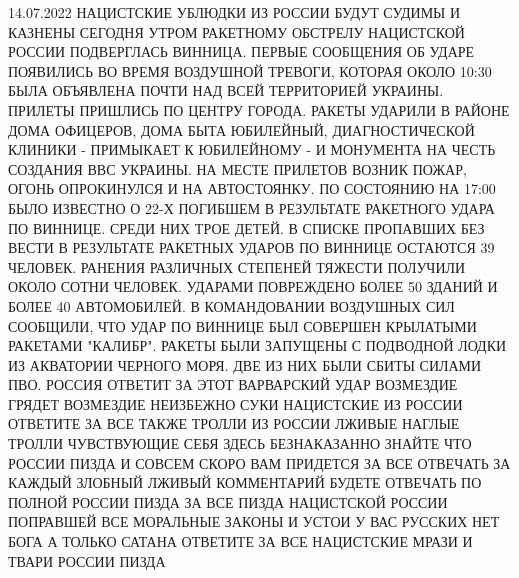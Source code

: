 14.07.2022
НАЦИСТСКИЕ УБЛЮДКИ ИЗ РОССИИ БУДУТ СУДИМЫ И КАЗНЕНЫ СЕГОДНЯ УТРОМ РАКЕТНОМУ
ОБСТРЕЛУ НАЦИСТСКОЙ РОССИИ ПОДВЕРГЛАСЬ ВИННИЦА. ПЕРВЫЕ СООБЩЕНИЯ ОБ УДАРЕ
ПОЯВИЛИСЬ ВО ВРЕМЯ ВОЗДУШНОЙ ТРЕВОГИ, КОТОРАЯ ОКОЛО 10:30 БЫЛА ОБЪЯВЛЕНА ПОЧТИ
НАД ВСЕЙ ТЕРРИТОРИЕЙ УКРАИНЫ. ПРИЛЕТЫ ПРИШЛИСЬ ПО ЦЕНТРУ ГОРОДА. РАКЕТЫ УДАРИЛИ
В РАЙОНЕ ДОМА ОФИЦЕРОВ, ДОМА БЫТА ЮБИЛЕЙНЫЙ, ДИАГНОСТИЧЕСКОЙ КЛИНИКИ
- ПРИМЫКАЕТ К ЮБИЛЕЙНОМУ - И МОНУМЕНТА НА ЧЕСТЬ СОЗДАНИЯ ВВС УКРАИНЫ.  НА МЕСТЕ
ПРИЛЕТОВ ВОЗНИК ПОЖАР, ОГОНЬ ОПРОКИНУЛСЯ И НА АВТОСТОЯНКУ. ПО СОСТОЯНИЮ НА
17:00 БЫЛО ИЗВЕСТНО О 22-Х ПОГИБШЕМ В РЕЗУЛЬТАТЕ РАКЕТНОГО УДАРА ПО ВИННИЦЕ.
СРЕДИ НИХ ТРОЕ ДЕТЕЙ. В СПИСКЕ ПРОПАВШИХ БЕЗ ВЕСТИ В РЕЗУЛЬТАТЕ РАКЕТНЫХ УДАРОВ
ПО ВИННИЦЕ ОСТАЮТСЯ 39 ЧЕЛОВЕК. РАНЕНИЯ РАЗЛИЧНЫХ СТЕПЕНЕЙ ТЯЖЕСТИ ПОЛУЧИЛИ
ОКОЛО СОТНИ ЧЕЛОВЕК. УДАРАМИ ПОВРЕЖДЕНО БОЛЕЕ 50 ЗДАНИЙ И БОЛЕЕ 40 АВТОМОБИЛЕЙ.
В КОМАНДОВАНИИ ВОЗДУШНЫХ СИЛ СООБЩИЛИ, ЧТО УДАР ПО ВИННИЦЕ БЫЛ СОВЕРШЕН
КРЫЛАТЫМИ РАКЕТАМИ "КАЛИБР". РАКЕТЫ БЫЛИ ЗАПУЩЕНЫ С ПОДВОДНОЙ ЛОДКИ ИЗ
АКВАТОРИИ ЧЕРНОГО МОРЯ. ДВЕ ИЗ НИХ БЫЛИ СБИТЫ СИЛАМИ ПВО.  РОССИЯ ОТВЕТИТ ЗА
ЭТОТ ВАРВАРСКИЙ УДАР ВОЗМЕЗДИЕ ГРЯДЕТ ВОЗМЕЗДИЕ НЕИЗБЕЖНО СУКИ НАЦИСТСКИЕ ИЗ
РОССИИ ОТВЕТИТЕ ЗА ВСЕ ТАКЖЕ ТРОЛЛИ ИЗ РОССИИ ЛЖИВЫЕ НАГЛЫЕ ТРОЛЛИ ЧУВСТВУЮЩИЕ
СЕБЯ ЗДЕСЬ БЕЗНАКАЗАННО ЗНАЙТЕ ЧТО РОССИИ ПИЗДА И СОВСЕМ СКОРО ВАМ ПРИДЕТСЯ ЗА
ВСЕ ОТВЕЧАТЬ ЗА КАЖДЫЙ ЗЛОБНЫЙ ЛЖИВЫЙ КОММЕНТАРИЙ БУДЕТЕ ОТВЕЧАТЬ ПО ПОЛНОЙ
РОССИИ ПИЗДА ЗА ВСЕ ПИЗДА НАЦИСТСКОЙ РОССИИ ПОПРАВШЕЙ ВСЕ МОРАЛЬНЫЕ ЗАКОНЫ И
УСТОИ У ВАС РУССКИХ НЕТ БОГА А ТОЛЬКО САТАНА ОТВЕТИТЕ ЗА ВСЕ НАЦИСТСКИЕ МРАЗИ И
ТВАРИ РОССИИ ПИЗДА
